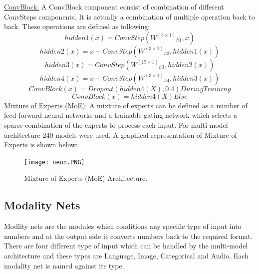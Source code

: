 \documentclass[12pt]{article}
\begin{document}
\underline{ConvBlock:} A ConvBlock component consist of combination of different ConvSteps components. It is actually a combination of multiple operation back to back. These operations are defined as following:
\begin{equation}
hidden1(x) = ConvStep({W^(3 \times 1)}_{h1},x) 
\end{equation}
\begin{equation}
hidden2(x) = x + ConvStep({W^(3 \times 1)}_{h2},hidden1(x))
\end{equation}
\begin{equation}
hidden3(x) = ConvStep({W^(15 \times 1)}_{h3},hidden2(x))
\end{equation}
\begin{equation}
hidden4(x) = x + ConvStep({W^(3 \times 1)}_{h4},hidden3(x))
\end{equation}
\begin{equation}
ConvBlock(x) = Dropout(hidden4(X),0.4)   During Training
\end{equation}
\begin{equation}
ConvBlock(x) = hidden4(X)  Else
\end{equation}
\underline{Mixture of Experts (MoE):} A mixture of experts \cite{ShazeerMMDLHD17} can be defined as a number of feed-forward neural networks and a trainable gating network which selects a sparse combination of the experts to process each input. For multi-model architecture 240 models were used. A graphical representation of Mixture of Experts is shown below:
\begin{center}
\begin{figure}[bp]
  \centering
  \begin{minipage}[b]{1.0\textwidth}
    \centering
    \texttt{[image: neun.PNG]}
      \centering
    \caption{Mixture of Experts (MoE) Architecture. \cite{KaiserGSVPJU17}}
  \end{minipage}
\end{figure}
\end{center}
\subsection{Modality Nets}
Modlity nets are the modules which conditions any specific type of input into numbers and at the output side it converts numbers back to the required format. There are four different type of input which can be handled by the multi-model architecture and these types are Language, Image, Categorical and Audio. Each modality net is named against its type.  
\end{document}
